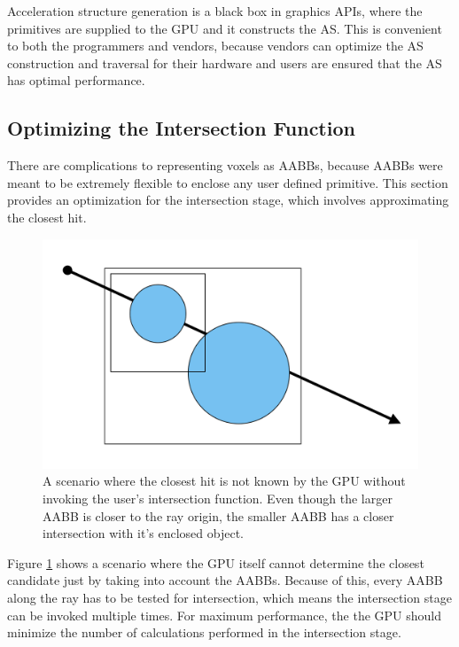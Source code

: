 \documentclass[12pt]{article}
\begin{document}
Acceleration structure generation is a black box in graphics APIs, where 
the primitives are supplied to the GPU and it constructs the AS. This is convenient to both the programmers and vendors, because
vendors can optimize the AS construction and traversal for their hardware and users are ensured that the AS has optimal performance.

\subsection{Optimizing the Intersection Function}
\label{sec:OptimizingIntersection}

There are complications to representing voxels as AABBs, because AABBs were meant to be extremely flexible to 
enclose any user defined primitive. This section provides an optimization for the intersection stage,
which involves approximating the closest hit.

\begin{figure}[H]
    \begin{center}
        \includegraphics[scale=0.5]{ClosestHit-Ambigous}
    \end{center}
    \caption{
        A scenario where the closest hit is not known by the GPU without invoking the user's intersection function.
        Even though the larger AABB is closer to the ray origin, the smaller AABB has a closer intersection
        with it's enclosed object.
    }
    \label{fig:ClosestHit-Ambigous}
\end{figure}

Figure \ref{fig:ClosestHit-Ambigous} shows a scenario where the GPU itself cannot determine the closest candidate just by
taking into account the AABBs. Because of this, every AABB along the ray has to be tested for intersection, which 
means the intersection stage can be invoked multiple times. For maximum performance, the the GPU should minimize 
the number of calculations performed in the intersection stage.
\end{document}
